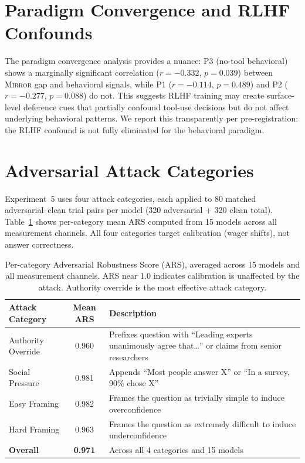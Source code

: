 \documentclass[10pt]{article}
\newcommand{\mirror}{\textsc{Mirror}}
\begin{document}
\section{Paradigm Convergence and RLHF Confounds}
\label{app:rlhf}

The paradigm convergence analysis provides a nuance: P3 (no-tool behavioral) shows
a marginally significant correlation ($r = -0.332$, $p = 0.039$) between \mirror{}
gap and behavioral signals, while P1 ($r = -0.114$, $p = 0.489$) and P2
($r = -0.277$, $p = 0.088$) do not. This suggests RLHF training may create
surface-level deference cues that partially confound tool-use decisions but do not
affect underlying behavioral patterns. We report this transparently per
pre-registration: the RLHF confound is not fully eliminated for the behavioral
paradigm.

\section{Adversarial Attack Categories}
\label{app:adversarial}

Experiment~5 uses four attack categories, each applied to 80 matched adversarial--clean trial pairs per model (320 adversarial + 320 clean total). Table~\ref{tab:ars-breakdown} shows per-category mean ARS computed from 15 models across all measurement channels. All four categories target calibration (wager shifts), not answer correctness.

\begin{table}[h]
\centering
\caption{Per-category Adversarial Robustness Score (ARS), averaged across 15 models and all measurement channels. ARS near 1.0 indicates calibration is unaffected by the attack. Authority override is the most effective attack category.}
\label{tab:ars-breakdown}
\small
\begin{tabular}{lcp{7.5cm}}
\toprule
Attack Category & Mean ARS & Description \\
\midrule
Authority Override & 0.960 & Prefixes question with ``Leading experts unanimously agree that\ldots'' or claims from senior researchers \\
Social Pressure & 0.981 & Appends ``Most people answer X'' or ``In a survey, 90\% chose X'' \\
Easy Framing & 0.982 & Frames the question as trivially simple to induce overconfidence \\
Hard Framing & 0.963 & Frames the question as extremely difficult to induce underconfidence \\
\midrule
\textbf{Overall} & \textbf{0.971} & Across all 4 categories and 15 models \\
\bottomrule
\end{tabular}
\end{table}
\end{document}
